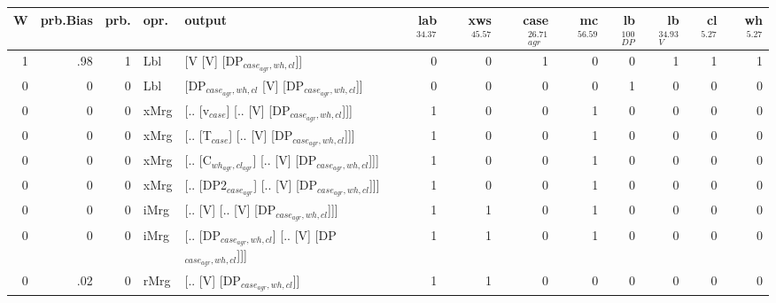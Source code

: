 \begin{tabularx}{\linewidth}{rrrlXrrrrrrrr}
\hline
   W &   prb.Bias &   prb. & opr.   & output                                                &   lab$^{34.37}$ &   xws$^{45.57}$ &   case$_{agr}^{26.71}$ &   mc$^{56.59}$ &   lb$_{DP}^{100}$ &   lb$_{V}^{34.93}$ &   cl$^{5.27}$ &   wh$^{5.27}$ \\
\hline
   1 &       .98 &   1 & Lbl  & [V [V] [DP$_{case_{agr},wh,cl}$]]                           &             0 &             0 &                  1 &            0 &                0 &              1 &        1 &        1 \\
   0 &       0 &   0 & Lbl  & [DP$_{case_{agr},wh,cl}$ [V] [DP$_{case_{agr},wh,cl}$]]           &             0 &             0 &                  0 &            0 &                1 &              0 &        0 &        0 \\
   0 &       0 &   0 & xMrg & [.. [v$_{case}$] [.. [V] [DP$_{case_{agr},wh,cl}$]]]            &             1 &             0 &                  0 &            1 &                0 &              0 &        0 &        0 \\
   0 &       0 &   0 & xMrg & [.. [T$_{case}$] [.. [V] [DP$_{case_{agr},wh,cl}$]]]            &             1 &             0 &                  0 &            1 &                0 &              0 &        0 &        0 \\
   0 &       0 &   0 & xMrg & [.. [C$_{wh_{agr},cl_{agr}}$] [.. [V] [DP$_{case_{agr},wh,cl}$]]]   &             1 &             0 &                  0 &            1 &                0 &              0 &        0 &        0 \\
   0 &       0 &   0 & xMrg & [.. [DP2$_{case_{agr}}$] [.. [V] [DP$_{case_{agr},wh,cl}$]]]      &             1 &             0 &                  0 &            1 &                0 &              0 &        0 &        0 \\
   0 &       0 &   0 & iMrg & [.. [V] [.. [V] [DP$_{case_{agr},wh,cl}$]]]                 &             1 &             1 &                  0 &            1 &                0 &              0 &        0 &        0 \\
   0 &       0 &   0 & iMrg & [.. [DP$_{case_{agr},wh,cl}$] [.. [V] [DP$_{case_{agr},wh,cl}$]]] &             1 &             1 &                  0 &            1 &                0 &              0 &        0 &        0 \\
   0 &       .02 &   0 & rMrg & [.. [V] [DP$_{case_{agr},wh,cl}$]]                          &             1 &             1 &                  0 &            0 &                0 &              0 &        0 &        0 \\
\hline
\end{tabularx}\endgroup\\
